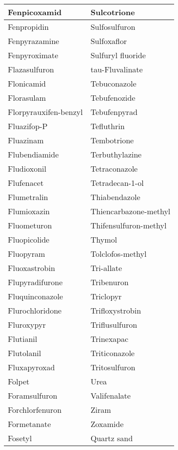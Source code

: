 \begin{small}
\begin{longtable}{|l|l|}
        Fenpicoxamid & Sulcotrione \\ \hline
        Fenpropidin & Sulfosulfuron \\ \hline
        Fenpyrazamine & Sulfoxaflor \\ \hline
        Fenpyroximate & Sulfuryl fluoride \\ \hline
        Flazasulfuron & tau-Fluvalinate \\ \hline
        Flonicamid & Tebuconazole \\ \hline
        Florasulam & Tebufenozide \\ \hline
        Florpyrauxifen-benzyl & Tebufenpyrad \\ \hline
        Fluazifop-P & Tefluthrin \\ \hline
        Fluazinam & Tembotrione \\ \hline
        Flubendiamide & Terbuthylazine \\ \hline
        Fludioxonil & Tetraconazole \\ \hline
        Flufenacet & Tetradecan-1-ol \\ \hline
        Flumetralin & Thiabendazole \\ \hline
        Flumioxazin & Thiencarbazone-methyl \\ \hline
        Fluometuron & Thifensulfuron-methyl \\ \hline
        Fluopicolide & Thymol \\ \hline
        Fluopyram & Tolclofos-methyl \\ \hline
        Fluoxastrobin & Tri-allate \\ \hline
        Flupyradifurone & Tribenuron \\ \hline
        Fluquinconazole & Triclopyr \\ \hline
        Flurochloridone & Trifloxystrobin \\ \hline
        Fluroxypyr & Triflusulfuron \\ \hline
        Flutianil & Trinexapac \\ \hline
        Flutolanil & Triticonazole \\ \hline
        Fluxapyroxad & Tritosulfuron \\ \hline
        Folpet & Urea \\ \hline
        Foramsulfuron & Valifenalate \\ \hline
        Forchlorfenuron & Ziram \\ \hline
        Formetanate & Zoxamide \\ \hline
        Fosetyl & Quartz sand \\ \hline

\end{longtable}
\end{small}

